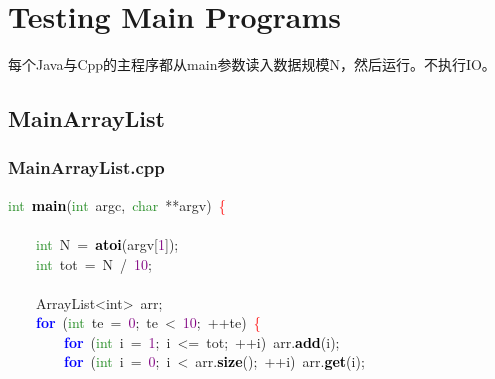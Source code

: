 \chapter{Testing Main Programs}

每个Java与Cpp的主程序都从main参数读入数据规模N，然后运行。不执行IO。

\section{MainArrayList}
\subsection{MainArrayList.cpp}
\noindent
\mbox{}\textcolor{ForestGreen}{int}\ \textbf{\textcolor{Black}{main}}\textcolor{BrickRed}{(}\textcolor{ForestGreen}{int}\ argc\textcolor{BrickRed}{,}\ \textcolor{ForestGreen}{char}\ \textcolor{BrickRed}{**}argv\textcolor{BrickRed}{)}\ \textcolor{Red}{\{} \\
\mbox{} \\
\mbox{}\ \ \ \ \textcolor{ForestGreen}{int}\ N\ \textcolor{BrickRed}{=}\ \textbf{\textcolor{Black}{atoi}}\textcolor{BrickRed}{(}argv\textcolor{BrickRed}{[}\textcolor{Purple}{1}\textcolor{BrickRed}{]);} \\
\mbox{}\ \ \ \ \textcolor{ForestGreen}{int}\ tot\ \textcolor{BrickRed}{=}\ N\ \textcolor{BrickRed}{/}\ \textcolor{Purple}{10}\textcolor{BrickRed}{;} \\
\mbox{} \\
\mbox{}\ \ \ \ \textcolor{TealBlue}{ArrayList\textless{}int\textgreater{}}\ arr\textcolor{BrickRed}{;} \\
\mbox{}\ \ \ \ \textbf{\textcolor{Blue}{for}}\ \textcolor{BrickRed}{(}\textcolor{ForestGreen}{int}\ te\ \textcolor{BrickRed}{=}\ \textcolor{Purple}{0}\textcolor{BrickRed}{;}\ te\ \textcolor{BrickRed}{\textless{}}\ \textcolor{Purple}{10}\textcolor{BrickRed}{;}\ \textcolor{BrickRed}{++}te\textcolor{BrickRed}{)}\ \textcolor{Red}{\{} \\
\mbox{}\ \ \ \ \ \ \ \ \textbf{\textcolor{Blue}{for}}\ \textcolor{BrickRed}{(}\textcolor{ForestGreen}{int}\ i\ \textcolor{BrickRed}{=}\ \textcolor{Purple}{1}\textcolor{BrickRed}{;}\ i\ \textcolor{BrickRed}{\textless{}=}\ tot\textcolor{BrickRed}{;}\ \textcolor{BrickRed}{++}i\textcolor{BrickRed}{)}\ arr\textcolor{BrickRed}{.}\textbf{\textcolor{Black}{add}}\textcolor{BrickRed}{(}i\textcolor{BrickRed}{);} \\
\mbox{}\ \ \ \ \ \ \ \ \textbf{\textcolor{Blue}{for}}\ \textcolor{BrickRed}{(}\textcolor{ForestGreen}{int}\ i\ \textcolor{BrickRed}{=}\ \textcolor{Purple}{0}\textcolor{BrickRed}{;}\ i\ \textcolor{BrickRed}{\textless{}}\ arr\textcolor{BrickRed}{.}\textbf{\textcolor{Black}{size}}\textcolor{BrickRed}{();}\ \textcolor{BrickRed}{++}i\textcolor{BrickRed}{)}\ arr\textcolor{BrickRed}{.}\textbf{\textcolor{Black}{get}}\textcolor{BrickRed}{(}i\textcolor{BrickRed}{);} \\
